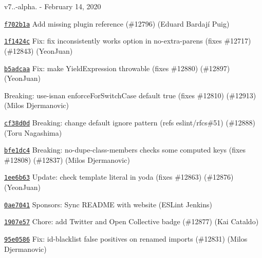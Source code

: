 v7..-\/alpha. -\/ February 14, 2020


\begin{DoxyItemize}
\item \href{https://github.com/eslint/eslint/commit/f702b1a54820d2b4e4993dcded99f551a98b490f}{\texttt{ {\ttfamily f702b1a}}} Add missing plugin reference (\#12796) (Eduard Bardají Puig)
\item \href{https://github.com/eslint/eslint/commit/1f1424cb200e609d58645f6c54739e11469e6265}{\texttt{ {\ttfamily 1f1424c}}} Fix\+: fix inconsistently works option in no-\/extra-\/parens (fixes \#12717) (\#12843) (Yeon\+Juan)
\item \href{https://github.com/eslint/eslint/commit/b5adcaab93f388f1d8e9d35d6f5e8c2994240850}{\texttt{ {\ttfamily b5adcaa}}} Fix\+: make Yield\+Expression throwable (fixes \#12880) (\#12897) (Yeon\+Juan)
\item \href{https://github.com/eslint/eslint/commit/4293229709dde105692347241513766e953664dd}{\texttt{ {}}} Breaking\+: use-\/isnan enforce\+For\+Switch\+Case default {\ttfamily true} (fixes \#12810) (\#12913) (Milos Djermanovic)
\item \href{https://github.com/eslint/eslint/commit/cf38d0d939b62f3670cdd59f0143fd896fccd771}{\texttt{ {\ttfamily cf38d0d}}} Breaking\+: change default ignore pattern (refs eslint/rfcs\#51) (\#12888) (Toru Nagashima)
\item \href{https://github.com/eslint/eslint/commit/bfe1dc4e614640cb69032afbb5851c1493f537e3}{\texttt{ {\ttfamily bfe1dc4}}} Breaking\+: no-\/dupe-\/class-\/members checks some computed keys (fixes \#12808) (\#12837) (Milos Djermanovic)
\item \href{https://github.com/eslint/eslint/commit/1ee6b6388305a8671c8d4c3cf30c2dbf18a1ff7e}{\texttt{ {\ttfamily 1ee6b63}}} Update\+: check template literal in yoda (fixes \#12863) (\#12876) (Yeon\+Juan)
\item \href{https://github.com/eslint/eslint/commit/0ae70417af70ad565450d9e779ae78c05f6a51e2}{\texttt{ {\ttfamily 0ae7041}}} Sponsors\+: Sync README with website (ESLint Jenkins)
\item \href{https://github.com/eslint/eslint/commit/1907e57362f7d5f7a02a5a78f24ac3347f868e93}{\texttt{ {\ttfamily 1907e57}}} Chore\+: add Twitter and Open Collective badge (\#12877) (Kai Cataldo)
\item \href{https://github.com/eslint/eslint/commit/95e0586c95e6953d11983d1d11891ed30318109a}{\texttt{ {\ttfamily 95e0586}}} Fix\+: id-\/blacklist false positives on renamed imports (\#12831) (Milos Djermanovic)

\end{DoxyItemize}
